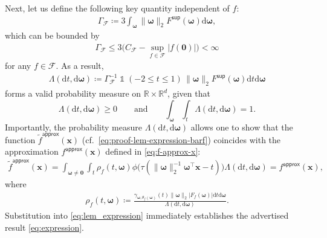 \documentclass[english]{article}
\DeclareMathOperator{\ind}{\mathds{1}}  %
\begin{document}
Next, let us define the following key quantity independent of $f$:
%
\begin{align*}
\Gamma_{\mathcal{F}} \coloneqq  3\int_{\bm{\omega}} \|{\bm \omega}\|_2F^{\mathsf{sup}}({\bm \omega})\mathrm{d}{\bm \omega},
\end{align*}
%
which can be bounded by
%
\begin{align}
\label{eq:UB-Gamma-F1}
\Gamma_{\mathcal{F}} \le 3\big(C_{\mathcal{F}} - \sup_{f\in\mathcal{F}}|f({\bm 0})|\big) < \infty
\end{align}
%
for any $f\in \mathcal{F}$. 
As a result,  
\begin{align}\label{eq:defn-Lambda}
\Lambda(\mathrm{d}t, \mathrm{d}{\bm \omega}) \coloneqq  \Gamma_{\mathcal{F}}^{-1}\ind(-2\le t\le 1)\,\|{\bm \omega}\|_2F^{\mathsf{sup}}({\bm \omega})\mathrm{d}t\mathrm{d}{\bm \omega}
\end{align} 
forms a valid probability measure on $\mathbb{R}\times\mathbb{R}^d$, given that $$\Lambda(\mathrm{d}t, \mathrm{d}{\bm \omega})\ge 0 \qquad \text{and}\qquad  
\int_{\bm \omega}\int_t\Lambda(\mathrm{d}t, \mathrm{d}{\bm \omega}) = 1.$$
Importantly, the probability measure  $\Lambda(\mathrm{d}t, \mathrm{d}{\bm \omega})$ allows one to show that the function
$\widetilde{f}^{\mathsf{approx}}({\bm x})$ (cf.~\eqref{eq:proof-lem-expression-barf}) coincides with the approximation $f^{\mathsf{approx}}({\bm x})$ defined in \eqref{eq:f-approx-x}:
%
\begin{align*}
\widetilde{f}^{\mathsf{approx}}({\bm x})
= \int_{{\bm \omega}\ne \bm{0}}\int_t \rho_f(t, {\bm \omega})\phi\big(\tau(\|{\bm \omega}\|_2^{-1}{\bm \omega}^{\top}{\bm x} - t)\big)\Lambda(\mathrm{d}t, \mathrm{d}{\bm \omega}) = f^{\mathsf{approx}}({\bm x}),
\end{align*}
%
where 
\begin{align}\label{eq:defn-rho-f}
\rho_f(t, {\bm \omega}) \coloneqq \frac{\gamma_{{\bm \omega}, \theta_f({\bm \omega})}(t)\|{\bm \omega}\|_2|F_f({\bm \omega})|\mathrm{d}t\mathrm{d}{\bm \omega}}{\Lambda(\mathrm{d}t, \mathrm{d}{\bm \omega})}.
\end{align}
Substitution into \eqref{eq:lem_expression} immediately establishes the advertised result  \eqref{eq:expression}.
\end{document}
